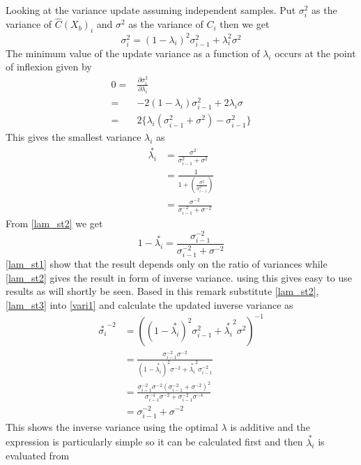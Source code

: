 \documentclass[a4paper,oneside,english]{book}
\numberwithin{equation}{section}
\numberwithin{figure}{section}
\begin{document}
Looking at the variance update assuming independent samples. Put $\sigma_i^2$ as the variance of $\hat{C}(X_b)_{i}$ and $\sigma^2$ as the variance of $C_i$ then we get
\begin{equation}\label{vari1}
\sigma_i^2=(1-\lambda_i)^2\sigma_{i-1}^2 +\lambda_i^2 \sigma^2
\end{equation} 
The minimum value of the update variance as a function of $\lambda_i$ occurs at the point of inflexion given by
\begin{align}
0=&\frac{\partial \sigma_i^2}{\partial \lambda_i}\\
=&-2(1-\lambda_i)\sigma_{i-1}^2+2\lambda_i \sigma\\
=&2\{ \lambda_i(\sigma_{i-1}^2 + \sigma^2) -\sigma_{i-1}^2\}
\end{align} 
This gives the smallest variance $\lambda_i$ as
\begin{align}
\stackrel{*}{\lambda_i} &= \frac{\sigma^2}{\sigma_{i-1}^2 + \sigma^2}\\
&=\frac{1}{1+(\frac{\sigma^2}{\sigma_{i-1}^2})} \label{lam_st1}\\
&=\frac{\sigma^{-2}}{\sigma_{i-1}^{-2} + \sigma^{-2}}
\label{lam_st2}
\end{align}
From \eqref{lam_st2} we get
\begin{equation}\label{lam_st3}
1-\stackrel{*}{\lambda_i} =\frac{\sigma_{i-1}^{-2}}{\sigma_{i-1}^{-2} + \sigma^{-2}} 
\end{equation}
\eqref{lam_st1} show that the result depends only on the ratio of variances while \eqref{lam_st2} gives the result in form of inverse variance. using this gives easy to use results as will shortly be seen. Based in this remark substitute \eqref{lam_st2},\eqref{lam_st3} into \eqref{vari1} and calculate the updated inverse variance as
\begin{align}
\stackrel{*}{\sigma_i}^{-2}&=((1-\stackrel{*}{\lambda_i})^2\sigma_{i-1}^2 +\stackrel{*}{\lambda_i}^2 \sigma^{2})^{-1}\\
&=\frac{\sigma_{i-1}^{-2} \sigma^{-2}}{(1-\stackrel{*}{\lambda_i})^2\sigma^{-2} +\stackrel{*}{\lambda_i}^2 \sigma_{i-1}^{-2}}\\
&=\frac{\sigma_{i-1}^{-2}\sigma^{-2}(\sigma_{i-1}^{-2} + \sigma^{-2})^2 }{\sigma_{i-1}^{-4}\sigma^{-2} + \sigma_{i-1}^{-2}\sigma^{-4}}\\
&=\sigma_{i-1}^{-2}+\sigma^{-2} \label{inv_var1}
\end{align}  
This shows the inverse variance using the optimal $\lambda$ is additive and the expression is particularly simple so it can be calculated first and then $\stackrel{*}{\lambda_i}$ is evaluated from
\end{document}
